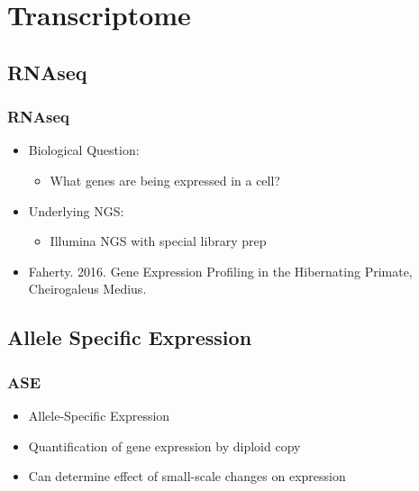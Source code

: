 \documentclass[14pt]{beamer}
\begin{document}
\section{Transcriptome}

\subsection{RNAseq}

\begin{frame}
\frametitle{RNAseq}
\begin{itemize}
	\item<+-> Biological Question:
	\begin{itemize}
		\item<+-> What genes are being expressed in a cell?
	\end{itemize}
	\item<+-> Underlying NGS:
	\begin{itemize}
		\item<+-> Illumina NGS with special library prep
	\end{itemize}
	\item<+-> Faherty. 2016. Gene Expression Profiling in the Hibernating Primate, Cheirogaleus Medius.
\end{itemize}
\end{frame}

\subsection{Allele Specific Expression}

\begin{frame}
\frametitle{ASE}
\begin{itemize}
	\item<+-> Allele-Specific Expression
	\item<+-> Quantification of gene expression by diploid copy
	\item<+-> Can determine effect of small-scale changes on expression
\end{itemize}
\end{frame}
\end{document}
